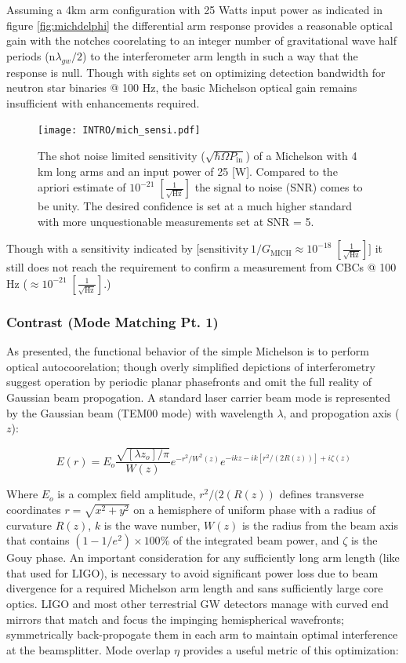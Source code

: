 Assuming a 4km arm configuration with 25 Watts input power as indicated in figure \autoref{fig:michdelphi} the differential arm response provides a reasonable optical gain with the notches coorelating to an integer number of gravitational wave half periods ($\mathrm{n}\lambda_{gw} / 2$) to the interferometer arm length in such a way that the response is null. Though with sights set on optimizing detection bandwidth for neutron star binaries @ 100 Hz, the basic Michelson optical gain remains insufficient with enhancements required.  

\begin{figure}[ht!]
	\centering
	\texttt{[image: INTRO/mich\_sensi.pdf]}
	\caption{The shot noise limited sensitivity ($\sqrt{\hbar \Omega P_\mathrm{in}}$) of a Michelson with 4 km long arms and an input power of 25 [W]. Compared to the apriori estimate of $10^{-21} \; [\frac{1}{\sqrt{\mathrm{Hz}}}]$ the signal to noise (SNR) comes to be unity. The desired confidence is set at a much higher standard with more unquestionable measurements set at SNR = 5.}
	\label{fig:michsensitivity}
\end{figure}

Though with a sensitivity indicated by [$\mathrm{sensitivity} ~ 1/G_\mathrm{MICH} \approx 10^{-18} \; [\frac{1}{\sqrt{\mathrm{Hz}}}]]$ it still does not reach the requirement to confirm a measurement from CBCs @ 100 Hz ($\approx 10^{-21} \; [\frac{1}{\sqrt{\mathrm{Hz}}}]$.)

\subsubsection{Contrast (Mode Matching Pt. 1)}
As presented, the functional behavior of the simple Michelson is to perform optical autocoorelation; though overly simplified depictions of interferometry suggest operation by periodic planar phasefronts and omit the full reality of Gaussian beam propogation. A standard laser carrier beam mode is represented by the Gaussian beam (TEM00 mode) with wavelength $\lambda$, and propogation axis ($z$):

\begin{equation}\label{eq:gaussianbeam}
E(r) = E_o \frac{\sqrt{[\lambda z_o] / \pi}}{W(z)}e^{-r^2 / W^2(z)} e^{-ikz - ik[r^2 / (2R(z))] + i \zeta(z)}
\end{equation}

Where $E_o$ is a complex field amplitude, $r^{2}/(2(R(z))$ defines transverse coordinates $r = \sqrt{x^{2} + y^{2}}$ on a hemisphere of uniform phase with a radius of curvature $R(z)$, $k$ is the wave number, $W(z)$ is the radius from the beam axis that contains $(1-1/e^2) \times 100 \%$ of the integrated beam power, and $\zeta$ is the Gouy phase. An important consideration for any sufficiently long arm length (like that used for LIGO), is necessary to avoid significant power loss due to beam divergence for a required Michelson arm length and sans sufficiently large core optics. LIGO and most other terrestrial GW detectors manage with curved end mirrors that match and focus the impinging hemispherical wavefronts; symmetrically back-propogate them in each arm to maintain optimal interference at the beamsplitter. Mode overlap $\eta$ provides a useful metric of this optimization: 

